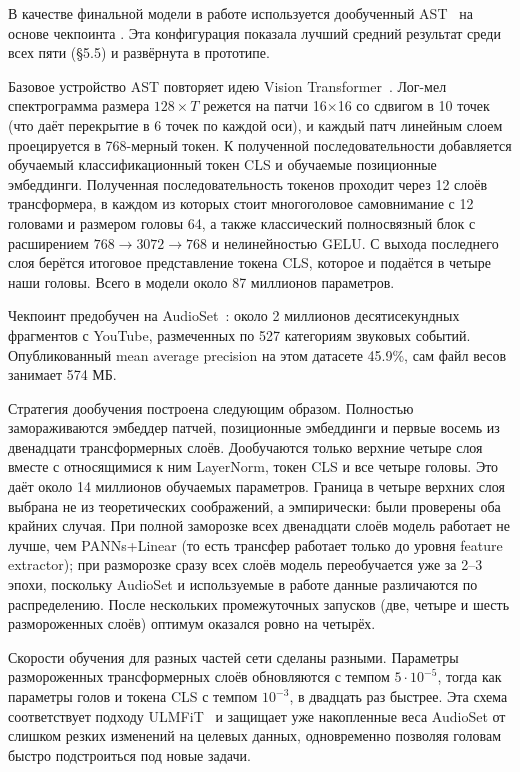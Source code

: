 В качестве финальной модели в работе используется дообученный AST~\cite{gong2021ast} на основе чекпоинта . Эта конфигурация показала лучший средний результат среди всех пяти (§5.5) и развёрнута в прототипе.

Базовое устройство AST повторяет идею Vision Transformer~\cite{dosovitskiy2021vit}. Лог-мел спектрограмма размера $128 \times T$ режется на патчи 16$\times$16 со сдвигом в 10 точек (что даёт перекрытие в 6 точек по каждой оси), и каждый патч линейным слоем проецируется в 768-мерный токен. К полученной последовательности добавляется обучаемый классификационный токен CLS и обучаемые позиционные эмбеддинги. Полученная последовательность токенов проходит через 12 слоёв трансформера, в каждом из которых стоит многоголовое самовнимание с 12 головами и размером головы 64, а также классический полносвязный блок с расширением $768 \to 3072 \to 768$ и нелинейностью GELU. С выхода последнего слоя берётся итоговое представление токена CLS, которое и подаётся в четыре наши головы. Всего в модели около 87 миллионов параметров.

Чекпоинт предобучен на AudioSet~\cite{gemmeke2017audioset}: около 2 миллионов десятисекундных фрагментов с YouTube, размеченных по 527 категориям звуковых событий. Опубликованный mean average precision на этом датасете 45.9\%, сам файл весов занимает 574 МБ.

Стратегия дообучения построена следующим образом. Полностью замораживаются эмбеддер патчей, позиционные эмбеддинги и первые восемь из двенадцати трансформерных слоёв. Дообучаются только верхние четыре слоя вместе с относящимися к ним LayerNorm, токен CLS и все четыре головы. Это даёт около 14 миллионов обучаемых параметров. Граница в четыре верхних слоя выбрана не из теоретических соображений, а эмпирически: были проверены оба крайних случая. При полной заморозке всех двенадцати слоёв модель работает не лучше, чем PANNs+Linear (то есть трансфер работает только до уровня feature extractor); при разморозке сразу всех слоёв модель переобучается уже за 2--3 эпохи, поскольку AudioSet и используемые в работе данные различаются по распределению. После нескольких промежуточных запусков (две, четыре и шесть размороженных слоёв) оптимум оказался ровно на четырёх.

Скорости обучения для разных частей сети сделаны разными. Параметры размороженных трансформерных слоёв обновляются с темпом $5 \cdot 10^{-5}$, тогда как параметры голов и токена CLS с темпом $10^{-3}$, в двадцать раз быстрее. Эта схема соответствует подходу ULMFiT~\cite{howard2018ulmfit} и защищает уже накопленные веса AudioSet от слишком резких изменений на целевых данных, одновременно позволяя головам быстро подстроиться под новые задачи.


